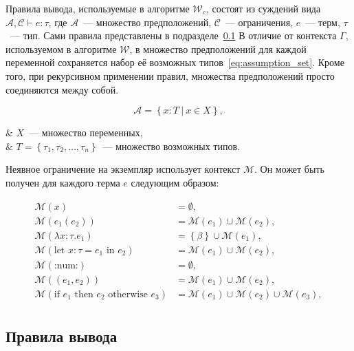 Правила вывода, используемые в алгоритме $\mathcal{W}_c$, состоят из суждений вида $\mathcal{A}, \mathcal{C} \vdash e: \tau$, где $\mathcal{A}$~--- множество предположений, $\mathcal{C}$~--- ограничения, $e$~--- терм, $\tau$~--- тип.
Сами правила представлены в подразделе~\ref{subsec:inference_rules}
В отличие от контекста $\Gamma$, используемом в алгоритме $\mathcal{W}$, в множество предположений для каждой переменной сохраняется набор её возможных типов~\eqref{eq:assumption_set}.
Кроме того, при рекурсивном применении правил, множества предположений просто соединяются между собой.

\begin{equation}
    \label{eq:assumption_set}
    \mathcal{A} = \left\{ x: T ~|~ x \in X \right\},
\end{equation}
\begin{eqrem}
    & $X$~--- множество переменных,                                                        \\
    & $T = \left\{ \tau_1, \tau_2, \ldots, \tau_n \right\}$~--- множество возможных типов. \\
\end{eqrem}

Неявное ограничение на экземпляр использует контекст $\mathcal{M}$.
Он может быть получен для каждого терма $e$ следующим образом:

\begin{equation}
    \label{eq:monomorphic_set}
    \begin{aligned}
        \mathcal{M}(x) &= \emptyset, \\
        \mathcal{M}(e_1(e_2)) &= \mathcal{M}(e_1) \cup \mathcal{M}(e_2), \\
        \mathcal{M}(\lambda x: \tau. e_1) &= \left\{ \beta \right\} \cup \mathcal{M}(e_1), \\
        \mathcal{M}(\text{let } x: \tau = e_1 \text{ in } e_2) &= \mathcal{M}(e_1) \cup \mathcal{M}(e_2), \\
        \mathcal{M}(\text{:num:}) &= \emptyset, \\
        \mathcal{M}((e_1, e_2)) &= \mathcal{M}(e_1) \cup \mathcal{M}(e_2), \\
        \mathcal{M}(\text{if } e_1 \text{ then } e_2 \text{ otherwise } e_3) &= \mathcal{M}(e_1) \cup \mathcal{M}(e_2) \cup \mathcal{M}(e_3), \\
    \end{aligned}
\end{equation}

\subsection{Правила вывода}
\label{subsec:inference_rules}

